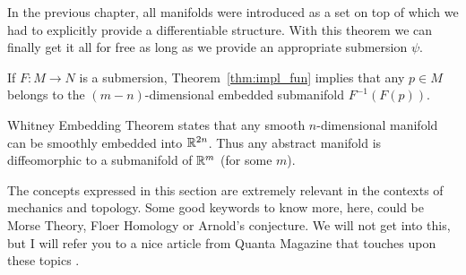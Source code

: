 In the previous chapter, all manifolds were introduced as a set on top of which we had to explicitly provide a differentiable structure. With this theorem we can finally get it all for free as long as we provide an appropriate submersion $\psi$.

\begin{remark}
  If $F:M\to N$ is a submersion, Theorem~\ref{thm:impl_fun} implies that any $p\in M$ belongs to the $(m-n)$-dimensional embedded submanifold $F^{-1}(F(p))$.
\end{remark}

%

\begin{remark}\label{rmk:WhitneyET}
  Whitney Embedding Theorem states that any smooth $n$-dimensional manifold can be smoothly embedded into $\mathbb{R}^{2n}$.
  Thus any abstract manifold is diffeomorphic to a submanifold of $\mathbb{R}^m$ (for some $m$).
\end{remark}

\begin{remark}
  The concepts expressed in this section are extremely relevant in the contexts of mechanics and topology.
  Some good keywords to know more, here, could be Morse Theory, Floer Homology or Arnold's conjecture.
  We will not get into this, but I will refer you to a nice article from Quanta Magazine that touches upon these topics \cite{article:quanta:floer}.
\end{remark}

